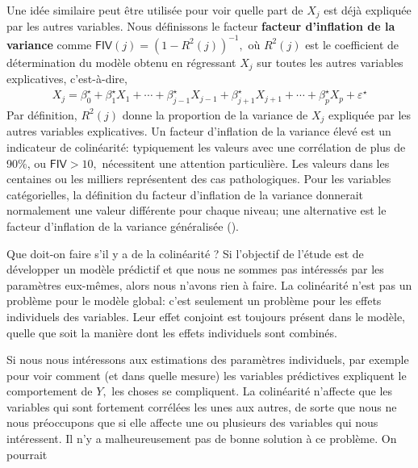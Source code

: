 \documentclass[
  11pt,
  letterpaper,
]{scrbook}
\theoremstyle{plain}
\theoremstyle{plain}
\theoremstyle{definition}
\theoremstyle{definition}
\theoremstyle{remark}
\begin{document}
Une idée similaire peut être utilisée pour voir quelle part de \(X_j\)
est déjà expliquée par les autres variables. Nous définissons le facteur
\textbf{facteur d'inflation de la variance} comme
\(\mathsf{FIV}(j)=(1-R^2(j))^{-1},\) où \(R^2(j)\) est le coefficient de
détermination du modèle obtenu en régressant \(X_j\) sur toutes les
autres variables explicatives, c'est-à-dire, \begin{align*}
X_j = \beta^{\star}_0 + \beta^{\star}_1 X_1 + \cdots + \beta^{\star}_{j-1} X_{j-1} + \beta^{\star}_{j+1} X_{j+1} + \cdots + \beta^{\star}_pX_p + \varepsilon^{\star}
\end{align*} Par définition, \(R^2(j)\) donne la proportion de la
variance de \(X_j\) expliquée par les autres variables explicatives. Un
facteur d'inflation de la variance élevé est un indicateur de
colinéarité: typiquement les valeurs avec une corrélation de plus de
90\%, ou \(\mathsf{FIV}>10,\) nécessitent une attention particulière.
Les valeurs dans les centaines ou les milliers représentent des cas
pathologiques. Pour les variables catégorielles, la définition du
facteur d'inflation de la variance donnerait normalement une valeur
différente pour chaque niveau; une alternative est le facteur
d'inflation de la variance généralisée ().

Que doit-on faire s'il y a de la colinéarité ? Si l'objectif de l'étude
est de développer un modèle prédictif et que nous ne sommes pas
intéressés par les paramètres eux-mêmes, alors nous n'avons rien à
faire. La colinéarité n'est pas un problème pour le modèle global: c'est
seulement un problème pour les effets individuels des variables. Leur
effet conjoint est toujours présent dans le modèle, quelle que soit la
manière dont les effets individuels sont combinés.

Si nous nous intéressons aux estimations des paramètres individuels, par
exemple pour voir comment (et dans quelle mesure) les variables
prédictives expliquent le comportement de \(Y,\) les choses se
compliquent. La colinéarité n'affecte que les variables qui sont
fortement corrélées les unes aux autres, de sorte que nous ne nous
préoccupons que si elle affecte une ou plusieurs des variables qui nous
intéressent. Il n'y a malheureusement pas de bonne solution à ce
problème. On pourrait
\end{document}

